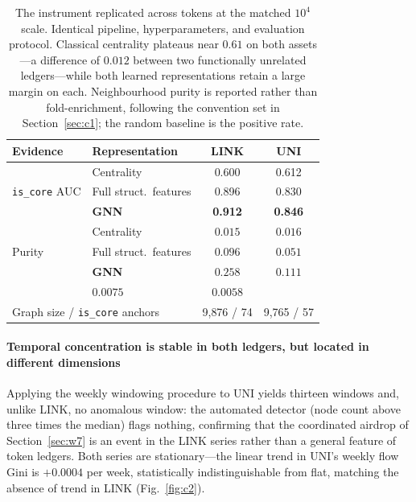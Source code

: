 \documentclass[final,5p,times]{elsarticle}
\begin{document}
\begin{table}[H]
\centering\small
\caption{The instrument replicated across tokens at the matched $10^4$
scale. Identical pipeline, hyperparameters, and evaluation protocol.
Classical centrality plateaus near $0.61$ on both assets---a difference of
$0.012$ between two functionally unrelated ledgers---while both learned
representations retain a large margin on each. Neighbourhood purity is
reported rather than fold-enrichment, following the convention set in
Section~\ref{sec:c1}; the random baseline is the positive rate.}
\label{tab:c1_cross}
\begin{tabular}{llcc}
\toprule
Evidence & Representation & LINK & UNI \\
\midrule
\multirow{3}{*}{\texttt{is\_core} AUC}
 & Centrality             & 0.600 & 0.612 \\
 & Full struct.\ features & 0.896 & 0.830 \\
 & \textbf{GNN}           & \textbf{0.912} & \textbf{0.846} \\
\midrule
\multirow{3}{*}{Purity}
 & Centrality             & $0.015$ & $0.016$ \\
 & Full struct.\ features & $0.096$ & $0.051$ \\
 & \textbf{GNN}           & $\mathbf{0.258}$ & $\mathbf{0.111}$ \\
\addlinespace[2pt]
\multicolumn{2}{l}{\quad Random baseline} & $0.0075$ & $0.0058$ \\
\midrule
\multicolumn{2}{l}{Graph size / \texttt{is\_core} anchors}
 & 9{,}876 / 74 & 9{,}765 / 57 \\
\bottomrule
\end{tabular}
\end{table}



\paragraph{Temporal concentration is stable in both ledgers, but located
in different dimensions}
Applying the weekly windowing procedure to UNI yields thirteen windows and,
unlike LINK, no anomalous window: the automated detector (node count above
three times the median) flags nothing, confirming that the coordinated
airdrop of Section~\ref{sec:w7} is an event in the LINK series rather than a
general feature of token ledgers. Both series are stationary---the linear
trend in UNI's weekly flow Gini is $+0.0004$ per week, statistically
indistinguishable from flat, matching the absence of trend in LINK (Fig.~\ref{fig:c2}).
\end{document}
